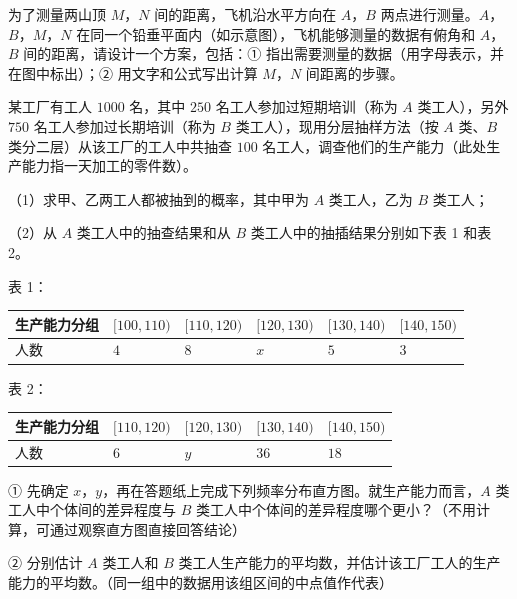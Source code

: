 \Needspace{0.4\textheight}
\begin{question}
为了测量两山顶 $M$，$N$ 间的距离，飞机沿水平方向在 $A$，$B$ 两点进行测量。$A$，$B$，$M$，$N$ 在同一个铅垂平面内（如示意图），飞机能够测量的数据有俯角和 $A$，$B$ 间的距离，请设计一个方案，包括：① 指出需要测量的数据（用字母表示，并在图中标出）；② 用文字和公式写出计算 $M$，$N$ 间距离的步骤。
\nopagebreak[4]
\begin{center}\end{center}
\nopagebreak[4]
\Needspace{0.4\textheight}
\end{question}
\begin{question}
某工厂有工人 $1000$ 名，其中 $250$ 名工人参加过短期培训（称为 $A$ 类工人），另外 $750$ 名工人参加过长期培训（称为 $B$ 类工人），现用分层抽样方法（按 $A$ 类、$B$ 类分二层）从该工厂的工人中共抽查 $100$ 名工人，调查他们的生产能力（此处生产能力指一天加工的零件数）。

（1）求甲、乙两工人都被抽到的概率，其中甲为 $A$ 类工人，乙为 $B$ 类工人；

（2）从 $A$ 类工人中的抽查结果和从 $B$ 类工人中的抽插结果分别如下表 1 和表 2。

表 1：

\begin{center}
\begin{tabular}{llllll}
\toprule
生产能力分组 & $[100,110)$ & $[110,120)$ & $[120,130)$ & $[130,140)$ & $[140,150)$ \\
\midrule
人数 & $4$ & $8$ & $x$ & $5$ & $3$ \\
\bottomrule
\end{tabular}
\end{center}

表 2：

\begin{center}
\begin{tabular}{lllll}
\toprule
生产能力分组 & $[110,120)$ & $[120,130)$ & $[130,140)$ & $[140,150)$ \\
\midrule
人数 & $6$ & $y$ & $36$ & $18$ \\
\bottomrule
\end{tabular}
\end{center}

① 先确定 $x$，$y$，再在答题纸上完成下列频率分布直方图。就生产能力而言，$A$ 类工人中个体间的差异程度与 $B$ 类工人中个体间的差异程度哪个更小？（不用计算，可通过观察直方图直接回答结论）
\nopagebreak[4]
\begin{center}\end{center}
\nopagebreak[4]
② 分别估计 $A$ 类工人和 $B$ 类工人生产能力的平均数，并估计该工厂工人的生产能力的平均数。（同一组中的数据用该组区间的中点值作代表）

\Needspace{0.4\textheight}
\end{question}
